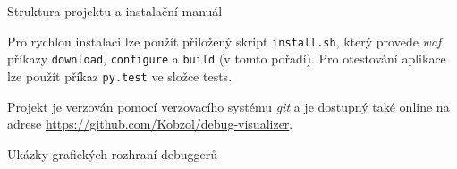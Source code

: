 \documentclass[bc,male,python,dept460]{diploma}						%
\newcommand{\parspace}[1][]{
	\ifthenelse{\isempty{#1}}{\vspace{5mm}}{\vspace{#1}}
	\par
}
\begin{document}
\begin{section}{Struktura projektu a instalační manuál}
	\parspace Pro rychlou instalaci lze použít přiložený skript \texttt{install.sh}, který provede \textit{waf} příkazy \texttt{download}, \texttt{configure}
	a \texttt{build} (v tomto pořadí).
	Pro otestování aplikace lze použít příkaz \texttt{py.test} ve složce tests.
	
	\vspace{5mm}
	
	Projekt je verzován pomocí verzovacího systému \textit{git} a je dostupný také online na adrese \url{https://github.com/Kobzol/debug-visualizer}.
\end{section}

\begin{section}{Ukázky grafických rozhraní debuggerů}
\label{appendix:gui}
\end{section}

\clearpage
\end{document}
